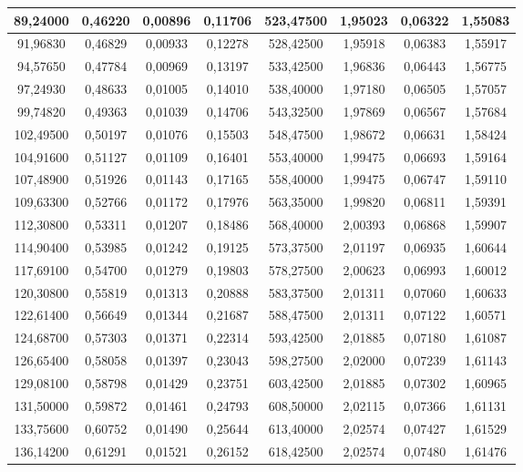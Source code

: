\documentclass[a4paper,12pt]{article}
\numberwithin{equation}{section}
\begin{document}
\begin{appendices}
\begin{longtable}[c]{|c|c|c|c|c|c|c|c|}
89,24000	&	0,46220	&	0,00896	&	0,11706	&	523,47500	&	1,95023	&	0,06322	&	1,55083	\\\hline
91,96830	&	0,46829	&	0,00933	&	0,12278	&	528,42500	&	1,95918	&	0,06383	&	1,55917	\\\hline
94,57650	&	0,47784	&	0,00969	&	0,13197	&	533,42500	&	1,96836	&	0,06443	&	1,56775	\\\hline
97,24930	&	0,48633	&	0,01005	&	0,14010	&	538,40000	&	1,97180	&	0,06505	&	1,57057	\\\hline
99,74820	&	0,49363	&	0,01039	&	0,14706	&	543,32500	&	1,97869	&	0,06567	&	1,57684	\\\hline
102,49500	&	0,50197	&	0,01076	&	0,15503	&	548,47500	&	1,98672	&	0,06631	&	1,58424	\\\hline
104,91600	&	0,51127	&	0,01109	&	0,16401	&	553,40000	&	1,99475	&	0,06693	&	1,59164	\\\hline
107,48900	&	0,51926	&	0,01143	&	0,17165	&	558,40000	&	1,99475	&	0,06747	&	1,59110	\\\hline
109,63300	&	0,52766	&	0,01172	&	0,17976	&	563,35000	&	1,99820	&	0,06811	&	1,59391	\\\hline
112,30800	&	0,53311	&	0,01207	&	0,18486	&	568,40000	&	2,00393	&	0,06868	&	1,59907	\\\hline
114,90400	&	0,53985	&	0,01242	&	0,19125	&	573,37500	&	2,01197	&	0,06935	&	1,60644	\\\hline
117,69100	&	0,54700	&	0,01279	&	0,19803	&	578,27500	&	2,00623	&	0,06993	&	1,60012	\\\hline
120,30800	&	0,55819	&	0,01313	&	0,20888	&	583,37500	&	2,01311	&	0,07060	&	1,60633	\\\hline
122,61400	&	0,56649	&	0,01344	&	0,21687	&	588,47500	&	2,01311	&	0,07122	&	1,60571	\\\hline
124,68700	&	0,57303	&	0,01371	&	0,22314	&	593,42500	&	2,01885	&	0,07180	&	1,61087	\\\hline
126,65400	&	0,58058	&	0,01397	&	0,23043	&	598,27500	&	2,02000	&	0,07239	&	1,61143	\\\hline
129,08100	&	0,58798	&	0,01429	&	0,23751	&	603,42500	&	2,01885	&	0,07302	&	1,60965	\\\hline
131,50000	&	0,59872	&	0,01461	&	0,24793	&	608,50000	&	2,02115	&	0,07366	&	1,61131	\\\hline
133,75600	&	0,60752	&	0,01490	&	0,25644	&	613,40000	&	2,02574	&	0,07427	&	1,61529	\\\hline
136,14200	&	0,61291	&	0,01521	&	0,26152	&	618,42500	&	2,02574	&	0,07480	&	1,61476	\\\hline

\end{longtable}
\end{appendices}
\end{document}
